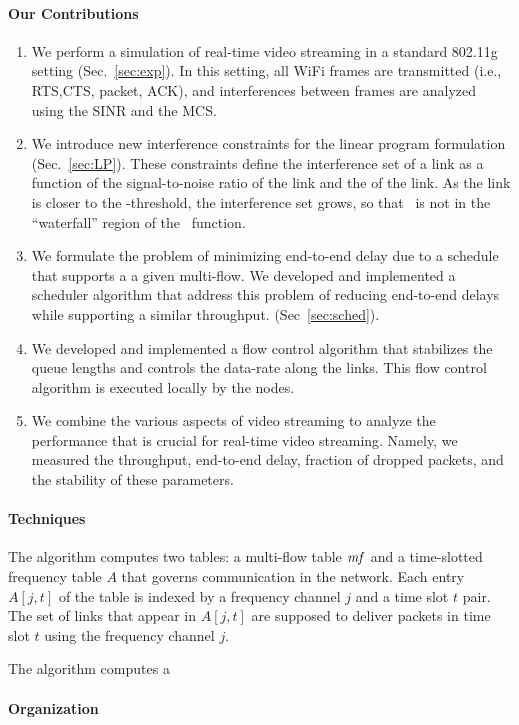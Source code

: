 \documentclass[12pt]{article}
\newenvironment{proof sketch}[1]{\noindent {\emph{Proof sketch of #1:}}}{\hfill \qed}
\newcommand{\SINR}{\text{\sc{sinr}}}
\newcommand{\PER}{\text{\sc{per}}}
\newcommand{\mf}{\text{\emph{mf}}}
\newcommand{\MCS}{\text{\sc{mcs}}}
\begin{document}
\paragraph{Our Contributions}
\begin{enumerate}
\item We perform a simulation of real-time video streaming in a
  standard 802.11g setting (Sec.~\ref{sec:exp}).  In this setting, all WiFi frames are
  transmitted (i.e., RTS,CTS, packet, ACK), and interferences between
  frames are analyzed using the SINR and the MCS.
\item We introduce new interference constraints for the linear program
  formulation (Sec.~\ref{sec:LP}).  These constraints define the interference set of a
  link as a function of the signal-to-noise ratio of the link and the
  \MCS of the link.  As the link is closer to the \SINR-threshold, the
  interference set grows, so that \SINR\ is not in the ``waterfall''
  region of the \PER\ function.
\item We formulate the problem of minimizing end-to-end delay due to a
  schedule that supports a a given multi-flow. We developed and
  implemented a scheduler algorithm that address this problem of
  reducing end-to-end delays while supporting a similar throughput.
  (Sec~\ref{sec:sched}).
\item We developed and implemented a flow control algorithm that
  stabilizes the queue lengths and controls the data-rate along the
  links.  This flow control algorithm is executed locally by the
  nodes.
\item We combine the various aspects of video streaming to analyze the
  performance that is crucial for real-time video streaming.  Namely,
  we measured the throughput, end-to-end delay, fraction of dropped
  packets, and the stability of these parameters.
\end{enumerate}

\paragraph{Techniques}
The algorithm computes two tables: a multi-flow table $\mf$ and a
time-slotted frequency table $A$ that governs communication in the
network. Each entry $A[j,t]$ of the table is indexed by a frequency
channel $j$ and a time slot $t$ pair.  The set of links that appear in
$A[j,t]$ are supposed to deliver packets in time slot $t$ using the
frequency channel $j$.


 The algorithm computes a
\paragraph{Organization}
\end{document}
